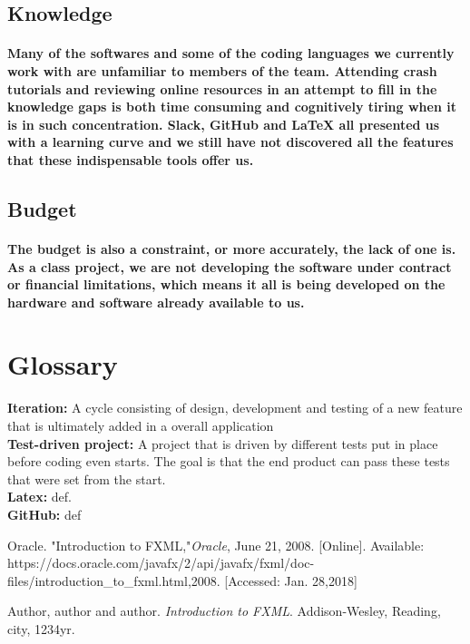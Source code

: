 \documentclass{article}
\begin{document}
\subsection{Knowledge}
\paragraph{\indent Many of the softwares and some of the coding languages we currently work with are unfamiliar to members of the team. Attending crash tutorials and reviewing online resources in an attempt to fill in the knowledge gaps is both time consuming and cognitively tiring when it is in such concentration. Slack, GitHub and LaTeX all presented us with a learning curve and we still have not discovered all the features that these indispensable tools offer us.  }

\subsection{Budget}
\paragraph{\indent The budget is also a constraint, or more accurately, the lack of one is. As a class project, we are not developing the software under contract or financial limitations, which means it all is being developed on the hardware and software already available to us.}


\newpage
\section {Glossary}

\textbf{\indent Iteration:} A cycle consisting of design, development and testing of a new feature that is ultimately added in a overall application\\

\textbf{Test-driven project:} A project that is driven by different tests put in place before coding even starts. The goal is that the end product can pass these tests that were set from the start.\\

\textbf{Latex: }def.\\

\textbf{GitHub: }def\\

\textbf{}

\newpage
\begin{thebibliography}{9}

Oracle. "Introduction to FXML,"\textit{Oracle}, June 21, 2008. [Online]. Available: https://docs.oracle.com/javafx/2/api/javafx/fxml/doc-files/introduction\_to\_fxml.html,2008. [Accessed: Jan. 28,2018]

Author, author and author. 
\textit{Introduction to FXML}.
Addison-Wesley, Reading, city, 1234yr.

\end{thebibliography}

 
\end{document}
